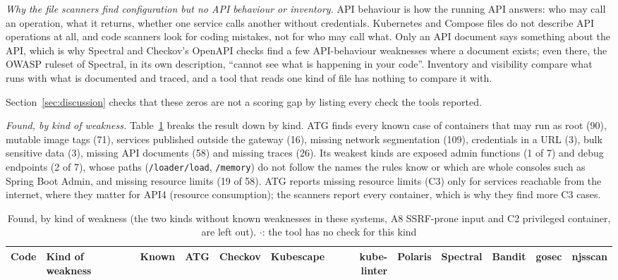 \textit{Why the file scanners find configuration but no API behaviour or inventory.} API behaviour is how the running API answers: who may call an operation, what it returns, whether one service calls another without credentials. Kubernetes and Compose files do not describe API operations at all, and code scanners look for coding mistakes, not for who may call what. Only an API document says something about the API, which is why Spectral and Checkov's OpenAPI checks find a few API-behaviour weaknesses where a document exists; even there, the OWASP ruleset of Spectral, in its own description, ``cannot see what is happening in your code''. Inventory and visibility compare what runs with what is documented and traced, and a tool that reads one kind of file has nothing to compare it with.

Section~\ref{sec:discussion} checks that these zeros are not a scoring gap by listing every check the tools reported.

\textit{Found, by kind of weakness.} Table~\ref{tab:kinds} breaks the result down by kind. ATG finds every known case of containers that may run as root (90), mutable image tags (71), services published outside the gateway (16), missing network segmentation (109), credentials in a URL (3), bulk sensitive data (3), missing API documents (58) and missing traces (26). Its weakest kinds are exposed admin functions (1 of 7) and debug endpoints (2 of 7), whose paths (\texttt{/loader/load}, \texttt{/memory}) do not follow the names the rules know or which are whole consoles such as Spring Boot Admin, and missing resource limits (19 of 58). ATG reports missing resource limits (C3) only for services reachable from the internet, where they matter for API4 (resource consumption); the scanners report every container, which is why they find more C3 cases.

\begin{table}[!t]
\caption{Found, by kind of weakness (the two kinds without known weaknesses in these systems, A8 SSRF-prone input and C2 privileged container, are left out). $\cdot$: the tool has no check for this kind}
\label{tab:kinds}
\centering
\scriptsize
\setlength{\tabcolsep}{3.5pt}
\begin{tabular}{@{}l>{\raggedright\arraybackslash}p{4.6cm}rrrrrrrrrr@{}}
\toprule
Code & Kind of weakness & Known & ATG & Checkov & Kubescape & kube-linter & Polaris & Spectral & Bandit & gosec & njsscan \\
\midrule
\bottomrule
\end{tabular}
\end{table}

